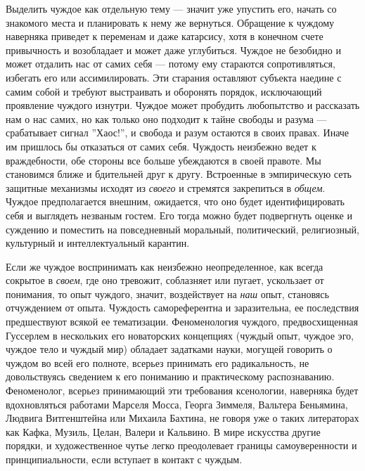 \documentclass[12pt]{book}
\begin{document}
Выделить чуждое как отдельную тему --- значит уже упустить его, начать со знакомого места и планировать к нему же вернуться. Обращение к чуждому наверняка приведет к переменам и даже катарсису, хотя в конечном счете привычность и возобладает и может даже углубиться. Чуждое не безобидно и может отдалить нас от самих себя --- потому ему стараются сопротивляться, избегать его или ассимилировать. Эти старания оставляют субъекта наедине с самим собой и требуют выстраивать и оборонять порядок, исключающий проявление чуждого изнутри. Чуждое может пробудить любопытство и рассказать нам о нас самих, но как только оно подходит к тайне свободы и разума --- срабатывает сигнал ''Хаос!'', и свобода и разум остаются в своих правах. Иначе им пришлось бы отказаться от самих себя. Чуждость неизбежно ведет к враждебности, обе стороны все больше убеждаются в своей правоте. Мы становимся ближе и бдительней друг к другу. Встроенные в эмпирическую сеть защитные механизмы исходят из \textit{своего} и стремятся закрепиться в \textit{общем}. Чуждое предполагается внешним, ожидается, что оно будет идентифицировать себя и выглядеть незваным гостем. Его тогда можно будет подвергнуть оценке и суждению и поместить на повседневный моральный, политический, религиозный, культурный и интеллектуальный карантин.

Если же чуждое воспринимать как неизбежно неопределенное, как всегда сокрытое в \textit{своем}, где оно тревожит, соблазняет или пугает, ускользает от понимания, то опыт чуждого, значит, воздействует на \textit{наш} опыт, становясь отчуждением от опыта. Чуждость самореферентна и заразительна, ее последствия предшествуют всякой ее тематизации. Феноменология чуждого, предвосхищенная Гуссерлем в нескольких его новаторских концепциях (чуждый опыт, чуждое эго, чуждое тело и чуждый мир) обладает задатками науки, могущей говорить о чуждом во всей его полноте, всерьез принимать его радикальность, не довольствуясь сведением к его пониманию и практическому распознаванию. Феноменолог, всерьез принимающий эти требования ксенологии, наверняка будет вдохновляться работами Марселя Мосса, Георга Зиммеля, Вальтера Беньямина, Людвига Витгенштейна или Михаила Бахтина, не говоря уже о таких литераторах как Кафка, Музиль, Целан, Валери и Кальвино. В мире искусства другие порядки, и художественное чутье легко преодолевает границы самоуверенности и принципиальности, если вступает в контакт с чуждым.
\end{document}
